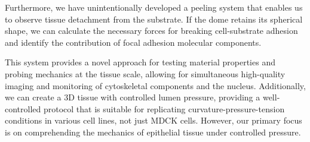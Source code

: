 Furthermore, we have unintentionally developed a peeling system that enables us to observe tissue detachment from the substrate. If the dome retains its spherical shape, we can calculate the necessary forces for breaking cell-substrate adhesion and identify the contribution of focal adhesion molecular components.

This system provides a novel approach for testing material properties and probing mechanics at the tissue scale, allowing for simultaneous high-quality imaging and monitoring of cytoskeletal components and the nucleus. Additionally, we can create a 3D tissue with controlled lumen pressure, providing a well-controlled protocol that is suitable for replicating curvature-pressure-tension conditions in various cell lines, not just MDCK cells. However, our primary focus is on comprehending the mechanics of epithelial tissue under controlled pressure.
